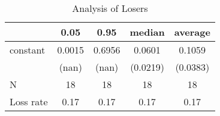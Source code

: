 \begin{table}
\caption{Analysis of Losers}
\begin{center}
\begin{tabular}{lcccc}
\hline
          &  0.05  &  0.95  &  median  & average   \\
\midrule
\midrule
constant  & 0.0015 & 0.6956 & 0.0601   & 0.1059    \\
          & (nan)  & (nan)  & (0.0219) & (0.0383)  \\
N         & 18     & 18     & 18       & 18        \\
Loss rate & 0.17   & 0.17   & 0.17     & 0.17      \\
\hline
\end{tabular}
\end{center}
\end{table}